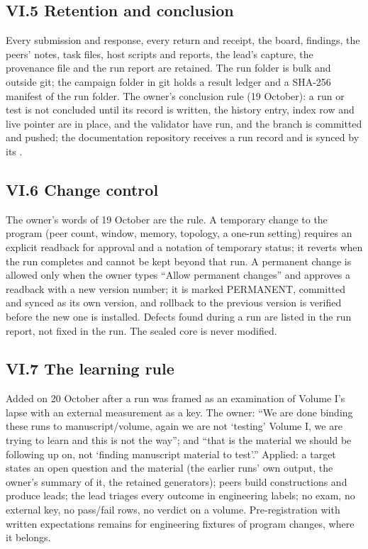\subsection{VI.5 Retention and conclusion}\label{vi.5-retention-and-conclusion}

Every submission and response, every return and receipt, the board, findings, the peers' notes, task files, host scripts and reports, the
lead's capture, the provenance file and the run report are retained. The run folder is bulk and outside git; the campaign folder in git
holds a result ledger and a SHA-256 manifest of the run folder. The owner's conclusion rule (19 October): a run or test is not concluded
until its record is written, the history entry, index row and live pointer are in place,  and the validator have run,
and the branch is committed and pushed; the documentation repository receives a run record and is synced by its .

\subsection{VI.6 Change control}\label{vi.6-change-control}

The owner's words of 19 October are the rule. A temporary change to the program (peer count, window, memory, topology, a one-run setting)
requires an explicit readback for approval and a notation of temporary status; it reverts when the run completes and cannot be kept beyond
that run. A permanent change is allowed only when the owner types ``Allow permanent changes'' and approves a readback with a new version
number; it is marked PERMANENT, committed and synced as its own version, and rollback to the previous version is verified before the new
one is installed. Defects found during a run are listed in the run report, not fixed in the run. The sealed core is never modified.

\subsection{VI.7 The learning rule}\label{vi.7-the-learning-rule}

Added on 20 October after a run was framed as an examination of Volume I's lapse with an external measurement as a key. The owner: ``We are
done binding these runs to manuscript/volume, again we are not `testing' Volume I, we are trying to learn and this is not the way''; and ``that
is the material we should be following up on, not `finding manuscript material to test'.'' Applied: a target states an open question and the
material (the earlier runs' own output, the owner's summary of it, the retained generators); peers build constructions and produce leads;
the lead triages every outcome in engineering labels; no exam, no external key, no pass/fail rows, no verdict on a volume. Pre-registration
with written expectations remains for engineering fixtures of program changes, where it belongs.

